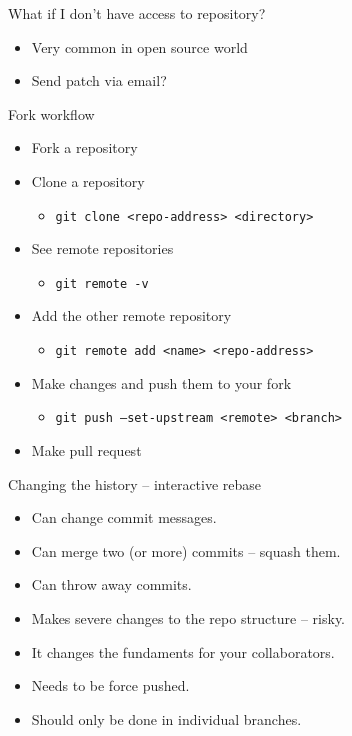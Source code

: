 \documentclass[14pt]{beamer}
\begin{document}
	\begin{frame}{What if I don't have access to repository?}
	\begin{itemize}
		\item Very common in open source world
		\item Send patch via email?
	\end{itemize}
	\end{frame}

	\begin{frame}{Fork workflow}
	\begin{itemize}
		\item Fork a repository
		\item Clone a repository
	        \begin{itemize}
		    \item \texttt{git clone <repo-address> <directory>}
	        \end{itemize}
		\item See remote repositories
	        \begin{itemize}
		    \item \texttt{git remote -v}
	        \end{itemize}
		\item Add the other remote repository
	        \begin{itemize}
		    \item \texttt{git remote add <name> <repo-address>}
	        \end{itemize}
		\item Make changes and push them to your fork
	        \begin{itemize}
		    \item \texttt{git push --set-upstream <remote> <branch>}
	        \end{itemize}
		\item Make pull request
	\end{itemize}
	\end{frame}

	\begin{frame}{Changing the history -- interactive rebase}
	\begin{itemize}
		\item Can change commit messages.
		\item Can merge two (or more) commits -- squash them.
		\item Can throw away commits.
		\item Makes severe changes to the repo structure -- risky.
		\item It changes the fundaments for your collaborators.
		\item Needs to be force pushed.
		\item Should only be done in individual branches.
	\end{itemize}
\end{frame}
\end{document}
